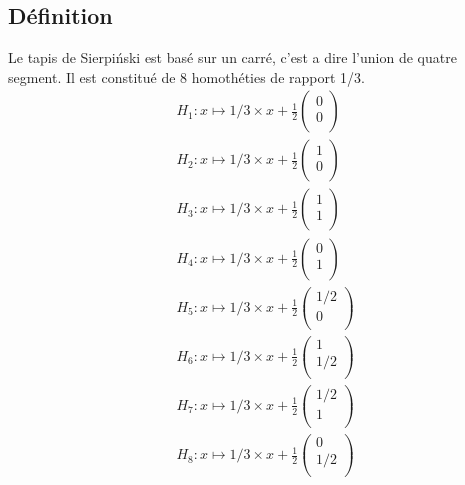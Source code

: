 \documentclass[a4paper, 12pt]{report}
\begin{document}
			\subsection{Définition}
				Le tapis de Sierpiński est basé sur un carré, c'est a dire l'union de quatre segment. Il est constitué de 8 homothéties de rapport 1/3.
				\begin{align*}
					&H_1:x\mapsto 1/3\times x+\frac{1}{2}\left(	\begin{array}{ccc}
																0\\
																0\\
															\end{array}\right)\\
					&H_2:x\mapsto 1/3\times x+\frac{1}{2}\left(	\begin{array}{ccc}
																	1\\
																	0\\
																\end{array}\right)\\
					&H_3:x\mapsto 1/3\times x+\frac{1}{2}\left(	\begin{array}{ccc}
																	1\\
																	1\\
																\end{array}\right)\\
					&H_4:x\mapsto 1/3\times x+\frac{1}{2}\left(	\begin{array}{ccc}
																	0\\
																	1\\
																\end{array}\right)\\
					&H_5:x\mapsto 1/3\times x+\frac{1}{2}\left(	\begin{array}{ccc}
																	1/2\\
																	0\\
																\end{array}\right)\\
					&H_6:x\mapsto 1/3\times x+\frac{1}{2}\left(	\begin{array}{ccc}
																	1\\
																	1/2\\
																\end{array}\right)\\
					&H_7:x\mapsto 1/3\times x+\frac{1}{2}\left(	\begin{array}{ccc}
																	1/2\\
																	1\\
																\end{array}\right)\\
					&H_8:x\mapsto 1/3\times x+\frac{1}{2}\left(	\begin{array}{ccc}
																	0\\
																	1/2\\
																\end{array}\right)
				\end{align*}
\end{document}
